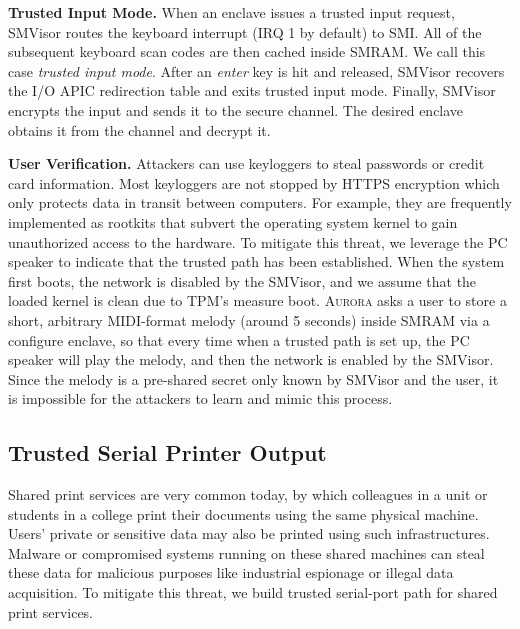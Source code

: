 \documentclass[journal,twocolumn,letterpaper,10pt]{IEEEtran}
\begin{document}
\textbf{Trusted Input Mode.}
When an enclave issues a trusted input request, SMVisor routes the keyboard interrupt (IRQ 1 by default) to SMI. All of the subsequent keyboard scan codes are then cached inside SMRAM. We call this case \emph{trusted input mode}. After an \emph{enter} key is hit and released, SMVisor recovers the I/O APIC redirection table and exits trusted input mode. Finally, SMVisor encrypts the input and sends it to the secure channel. The desired enclave obtains it from the channel and decrypt it.

\textbf{User Verification.}
Attackers can use keyloggers to steal passwords or credit card information. Most keyloggers are not stopped by HTTPS encryption which only protects data in transit between computers. For example, they are frequently implemented as rootkits that subvert the operating system kernel to gain unauthorized access to the hardware. 
To mitigate this threat, we leverage the PC speaker to indicate that the trusted path has been established.
When the system first boots, the network is disabled by the SMVisor, and we assume that the loaded kernel is clean due to TPM's measure boot. \textsc{Aurora} asks a user to store a short, arbitrary MIDI-format melody (around 5 seconds) inside SMRAM via a configure enclave, so that every time when a trusted path is set up, the PC speaker will play the melody, and then the network is enabled by the SMVisor. Since the melody is a pre-shared secret only known by SMVisor and the user, it is impossible for the attackers to learn and mimic this process.

\subsection{Trusted Serial Printer Output}\label{output_service}
Shared print services are very common today, by which colleagues in a unit or students in a college print their documents using the same physical machine. Users' private or sensitive data may also be printed using such infrastructures. Malware or compromised systems running on these shared machines can steal these data for malicious purposes like industrial espionage or illegal data acquisition. To mitigate this threat, we build trusted serial-port path for shared print services.
\end{document}
